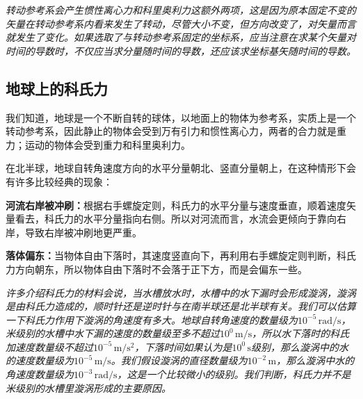 \textit{转动参考系会产生惯性离心力和科里奥利力这额外两项，这是因为原本固定不变的矢量在转动参考系内看来发生了转动，尽管大小不变，但方向改变了，对矢量而言就发生了变化。如果选取了与转动参考系固定的坐标系，应当注意在求某个矢量对时间的导数时，不仅应当求分量随时间的导数，还应该求坐标基矢随时间的导数。}
\subsection{地球上的科氏力}
我们知道，地球是一个不断自转的球体，以地面上的物体为参考系，实质上是一个转动参考系，因此静止的物体会受到万有引力和惯性离心力，两者的合力就是重力；运动的物体会受到重力和科里奥利力。

在北半球，地球自转角速度方向的水平分量朝北、竖直分量朝上，在这种情形下会有许多比较经典的现象：

\noindent \textbf{河流右岸被冲刷：}根据右手螺旋定则，科氏力的水平分量与速度垂直，顺着速度矢量看去，科氏力的水平分量指向右侧。所以对河流而言，水流会更倾向于靠向右岸，导致右岸被冲刷地更严重。

\noindent \textbf{落体偏东：}当物体自由下落时，其速度竖直向下，再利用右手螺旋定则判断，科氏力方向朝东，所以物体自由下落时不会落于正下方，而是会偏东一些。

\textit{许多介绍科氏力的材料会说，当水槽放水时，水槽中的水下漏时会形成漩涡，漩涡是由科氏力造成的，顺时针还是逆时针与在南半球还是北半球有关。我们可以估算一下科氏力作用下漩涡的角速度有多大。地球自转角速度的数量级为$10^{-5}\,\mathrm{rad/s}$，米级别的水槽中水下漏的速度的数量级至多不超过$10^{0}\,\mathrm{m/s}$，所以水下落时的科氏加速度数量级不超过$10^{-5}\,\mathrm{m/s^{2}}$，下落时间如果认为是$10^{0}\,\mathrm{s}$级别，那么漩涡中的水的速度数量级为$10^{-5}\,\mathrm{m/s}$。我们假设漩涡的直径数量级为$10^{-2}\,\mathrm{m}$，那么漩涡中水的角速度数量级为$10^{-3}\,\mathrm{rad/s}$，这是一个比较微小的级别。我们判断，科氏力并不是米级别的水槽里漩涡形成的主要原因。}
